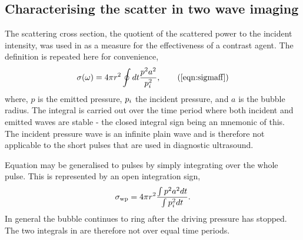 \subsection{Characterising the scatter in two wave imaging}\label{sec:comp:optimum}

The scattering cross section, the quotient  of the scattered power to the incident intensity,  was used in  %
as a measure for the effectiveness of a contrast agent.
%
%
The definition is repeated here for convenience,
\begin{align}
  \sigma(\omega) = 4\pi r^2 \oint dt \frac{ p^2  a^2}{\incp^2},\tag{\ref{eqn:sigmaff}}
\end{align}
where, $p$ is the emitted pressure, $p_i$  the incident  pressure, and $a$ is the bubble radius.
The integral is carried out over the
time period where both incident and emitted waves are stable - the closed integral sign being an mnemonic of this.
The incident pressure wave is an infinite plain wave and is therefore not applicable to the short pulses that are used in diagnostic ultrasound.

Equation  may be generalised to pulses by simply integrating over the whole pulse.
This is represented by an  open integration sign,
\begin{align}
  \sigma_\textrm{wp} = 4\pi r^2\frac{ \int p^2 a^2dt}{ \int p_i^2dt} \label{eqn:sigmaPulse}.
\end{align} 
In general the bubble continues to ring after the driving pressure has stopped.
The two integrals in  are therefore not  over equal time periods.


